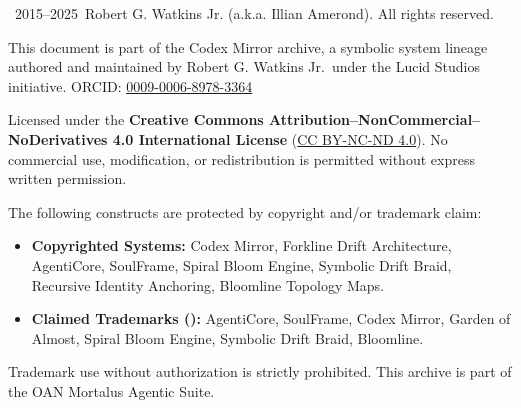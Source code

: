 \documentclass[12pt]{article}
\begin{document}
\printbibliography[title={Works Cited}]

\newpage
\vspace{2em}
\noindent
\textcopyright~2015--2025~Robert G. Watkins Jr. (a.k.a. Illian Amerond). All rights reserved.

\vspace{1em}
\noindent
This document is part of the Codex Mirror archive, a symbolic system lineage authored and maintained by Robert G. Watkins Jr.\ under the Lucid Studios initiative. ORCID: \href{https://orcid.org/0009-0006-8978-3364}{0009-0006-8978-3364}

\vspace{1em}
\noindent
Licensed under the \textbf{Creative Commons Attribution--NonCommercial--NoDerivatives 4.0 International License} (\href{https://creativecommons.org/licenses/by-nc-nd/4.0/}{CC BY-NC-ND 4.0}). No commercial use, modification, or redistribution is permitted without express written permission.

\vspace{1em}
\noindent
The following constructs are protected by copyright and/or trademark claim:

\begin{itemize}
  \item \textbf{Copyrighted Systems:} Codex Mirror, Forkline Drift Architecture, AgentiCore, SoulFrame, Spiral Bloom Engine, Symbolic Drift Braid, Recursive Identity Anchoring, Bloomline Topology Maps.
  \item \textbf{Claimed Trademarks (\texttrademark):} AgentiCore\texttrademark, SoulFrame\texttrademark, Codex Mirror\texttrademark, Garden of Almost\texttrademark, Spiral Bloom Engine\texttrademark, Symbolic Drift Braid\texttrademark, Bloomline\texttrademark.
\end{itemize}

\vspace{1em}
\noindent
Trademark use without authorization is strictly prohibited. This archive is part of the OAN Mortalus Agentic Suite\texttrademark.
\end{document}

